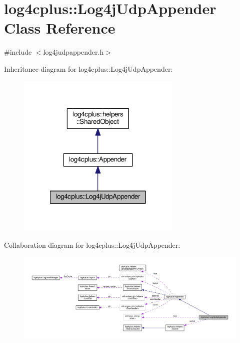 \hypertarget{classlog4cplus_1_1Log4jUdpAppender}{\section{log4cplus\-:\-:Log4j\-Udp\-Appender Class Reference}
\label{classlog4cplus_1_1Log4jUdpAppender}
}


{\ttfamily \#include $<$log4judpappender.\-h$>$}



Inheritance diagram for log4cplus\-:\-:Log4j\-Udp\-Appender\-:
\nopagebreak
\begin{figure}[H]
\begin{center}
\leavevmode
\includegraphics[width=222pt]{classlog4cplus_1_1Log4jUdpAppender__inherit__graph}
\end{center}
\end{figure}


Collaboration diagram for log4cplus\-:\-:Log4j\-Udp\-Appender\-:
\nopagebreak
\begin{figure}[H]
\begin{center}
\leavevmode
\includegraphics[width=350pt]{classlog4cplus_1_1Log4jUdpAppender__coll__graph}
\end{center}
\end{figure}
